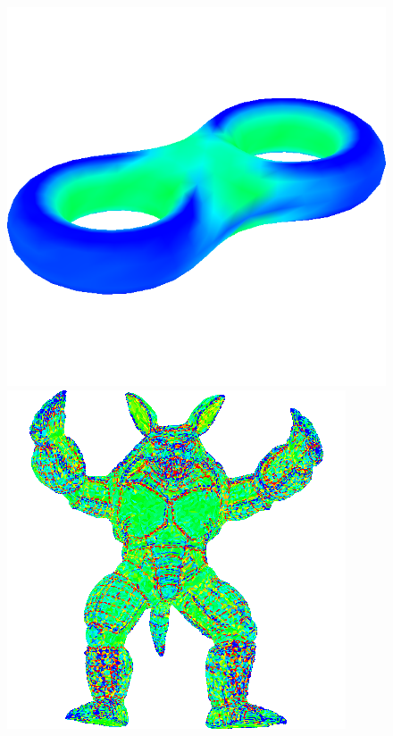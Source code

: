 \begin{figure}[!h]
    \endminipage\hfill
    \centering
    \centering
    \includegraphics[scale=0.45]{images/eight-mcv.png}
    \endminipage\hfill
    \centering
    \centering
    \includegraphics[scale=0.7]{images/armadillo-mce.png}
    \endminipage\hfill
    \centering
    \centering

\end{figure}
